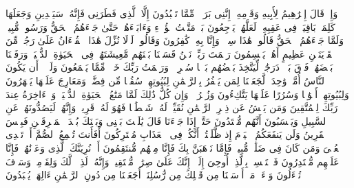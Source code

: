 \startbuffer[\q:43:26]
وَإِذۡ قَالَ إِبۡرَٰهِیمُ لِأَبِیهِ وَقَوۡمِهِۦۤ إِنَّنِی بَرَاۤءࣱ مِّمَّا تَعۡبُدُونَ%
\stopbuffer%
\startbuffer[\q:43:27]
إِلَّا ٱلَّذِی فَطَرَنِی فَإِنَّهُۥ سَیَهۡدِینِ%
\stopbuffer%
\startbuffer[\q:43:28]
وَجَعَلَهَا كَلِمَةَۢ بَاقِیَةࣰ فِی عَقِبِهِۦ لَعَلَّهُمۡ یَرۡجِعُونَ%
\stopbuffer%
\startbuffer[\q:43:29]
بَلۡ مَتَّعۡتُ هَٰۤؤُلَاۤءِ وَءَابَاۤءَهُمۡ حَتَّىٰ جَاۤءَهُمُ ٱلۡحَقُّ وَرَسُولࣱ مُّبِینࣱ%
\stopbuffer%
\startbuffer[\q:43:30]
وَلَمَّا جَاۤءَهُمُ ٱلۡحَقُّ قَالُوا۟ هَٰذَا سِحۡرࣱ وَإِنَّا بِهِۦ كَٰفِرُونَ%
\stopbuffer%
\startbuffer[\q:43:31]
وَقَالُوا۟ لَوۡلَا نُزِّلَ هَٰذَا ٱلۡقُرۡءَانُ عَلَىٰ رَجُلࣲ مِّنَ ٱلۡقَرۡیَتَیۡنِ عَظِیمٍ%
\stopbuffer%
\startbuffer[\q:43:32]
أَهُمۡ یَقۡسِمُونَ رَحۡمَتَ رَبِّكَۚ نَحۡنُ قَسَمۡنَا بَیۡنَهُم مَّعِیشَتَهُمۡ فِی ٱلۡحَیَوٰةِ ٱلدُّنۡیَاۚ وَرَفَعۡنَا بَعۡضَهُمۡ فَوۡقَ بَعۡضࣲ دَرَجَٰتࣲ لِّیَتَّخِذَ بَعۡضُهُم بَعۡضࣰا سُخۡرِیࣰّاۗ وَرَحۡمَتُ رَبِّكَ خَیۡرࣱ مِّمَّا یَجۡمَعُونَ%
\stopbuffer%
\startbuffer[\q:43:33]
وَلَوۡلَاۤ أَن یَكُونَ ٱلنَّاسُ أُمَّةࣰ وَٰحِدَةࣰ لَّجَعَلۡنَا لِمَن یَكۡفُرُ بِٱلرَّحۡمَٰنِ لِبُیُوتِهِمۡ سُقُفࣰا مِّن فِضَّةࣲ وَمَعَارِجَ عَلَیۡهَا یَظۡهَرُونَ%
\stopbuffer%
\startbuffer[\q:43:34]
وَلِبُیُوتِهِمۡ أَبۡوَٰبࣰا وَسُرُرًا عَلَیۡهَا یَتَّكِءُونَ%
\stopbuffer%
\startbuffer[\q:43:35]
وَزُخۡرُفࣰاۚ وَإِن كُلُّ ذَٰلِكَ لَمَّا مَتَٰعُ ٱلۡحَیَوٰةِ ٱلدُّنۡیَاۚ وَٱلۡءَاخِرَةُ عِندَ رَبِّكَ لِلۡمُتَّقِینَ%
\stopbuffer%
\startbuffer[\q:43:36]
وَمَن یَعۡشُ عَن ذِكۡرِ ٱلرَّحۡمَٰنِ نُقَیِّضۡ لَهُۥ شَیۡطَٰنࣰا فَهُوَ لَهُۥ قَرِینࣱ%
\stopbuffer%
\startbuffer[\q:43:37]
وَإِنَّهُمۡ لَیَصُدُّونَهُمۡ عَنِ ٱلسَّبِیلِ وَیَحۡسَبُونَ أَنَّهُم مُّهۡتَدُونَ%
\stopbuffer%
\startbuffer[\q:43:38]
حَتَّىٰۤ إِذَا جَاۤءَنَا قَالَ یَٰلَیۡتَ بَیۡنِی وَبَیۡنَكَ بُعۡدَ ٱلۡمَشۡرِقَیۡنِ فَبِئۡسَ ٱلۡقَرِینُ%
\stopbuffer%
\startbuffer[\q:43:39]
وَلَن یَنفَعَكُمُ ٱلۡیَوۡمَ إِذ ظَّلَمۡتُمۡ أَنَّكُمۡ فِی ٱلۡعَذَابِ مُشۡتَرِكُونَ%
\stopbuffer%
\startbuffer[\q:43:40]
أَفَأَنتَ تُسۡمِعُ ٱلصُّمَّ أَوۡ تَهۡدِی ٱلۡعُمۡیَ وَمَن كَانَ فِی ضَلَٰلࣲ مُّبِینࣲ%
\stopbuffer%
\startbuffer[\q:43:41]
فَإِمَّا نَذۡهَبَنَّ بِكَ فَإِنَّا مِنۡهُم مُّنتَقِمُونَ%
\stopbuffer%
\startbuffer[\q:43:42]
أَوۡ نُرِیَنَّكَ ٱلَّذِی وَعَدۡنَٰهُمۡ فَإِنَّا عَلَیۡهِم مُّقۡتَدِرُونَ%
\stopbuffer%
\startbuffer[\q:43:43]
فَٱسۡتَمۡسِكۡ بِٱلَّذِیۤ أُوحِیَ إِلَیۡكَۖ إِنَّكَ عَلَىٰ صِرَٰطࣲ مُّسۡتَقِیمࣲ%
\stopbuffer%
\startbuffer[\q:43:44]
وَإِنَّهُۥ لَذِكۡرࣱ لَّكَ وَلِقَوۡمِكَۖ وَسَوۡفَ تُسۡءَلُونَ%
\stopbuffer%
\startbuffer[\q:43:45]
وَسۡءَلۡ مَنۡ أَرۡسَلۡنَا مِن قَبۡلِكَ مِن رُّسُلِنَاۤ أَجَعَلۡنَا مِن دُونِ ٱلرَّحۡمَٰنِ ءَالِهَةࣰ یُعۡبَدُونَ%
\stopbuffer%
